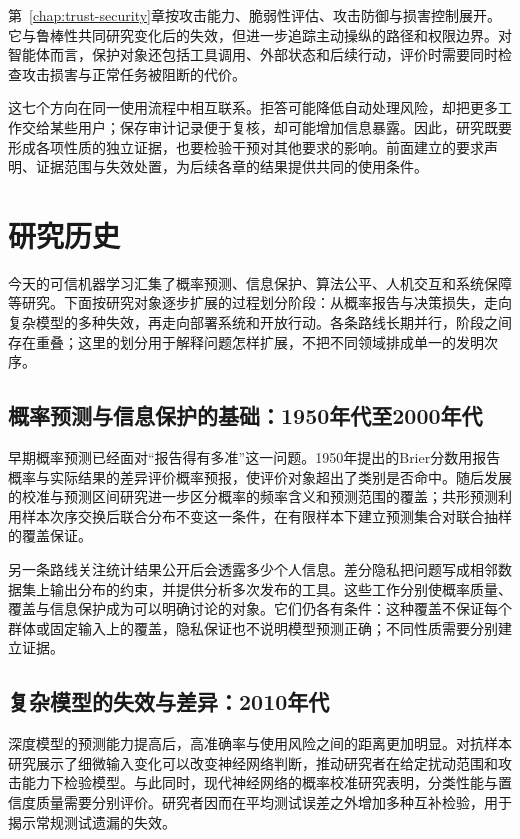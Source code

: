 第~\ref{chap:trust-security}章按攻击能力、脆弱性评估、攻击防御与损害控制展开。它与鲁棒性共同研究变化后的失效，但进一步追踪主动操纵的路径和权限边界。对智能体而言，保护对象还包括工具调用、外部状态和后续行动，评价时需要同时检查攻击损害与正常任务被阻断的代价。

这七个方向在同一使用流程中相互联系。拒答可能降低自动处理风险，却把更多工作交给某些用户；保存审计记录便于复核，却可能增加信息暴露。因此，研究既要形成各项性质的独立证据，也要检验干预对其他要求的影响。前面建立的要求声明、证据范围与失效处置，为后续各章的结果提供共同的使用条件。

\section{研究历史}
\label{sec:trust-research-history}

今天的可信机器学习汇集了概率预测、信息保护、算法公平、人机交互和系统保障等研究。下面按研究对象逐步扩展的过程划分阶段：从概率报告与决策损失，走向复杂模型的多种失效，再走向部署系统和开放行动。各条路线长期并行，阶段之间存在重叠；这里的划分用于解释问题怎样扩展，不把不同领域排成单一的发明次序。

\subsection{概率预测与信息保护的基础：1950年代至2000年代}

早期概率预测已经面对“报告得有多准”这一问题。1950年提出的Brier分数用报告概率与实际结果的差异评价概率预报，使评价对象超出了类别是否命中。随后发展的校准与预测区间研究进一步区分概率的频率含义和预测范围的覆盖；共形预测利用样本次序交换后联合分布不变这一条件，在有限样本下建立预测集合对联合抽样的覆盖保证。

另一条路线关注统计结果公开后会透露多少个人信息。差分隐私把问题写成相邻数据集上输出分布的约束，并提供分析多次发布的工具。这些工作分别使概率质量、覆盖与信息保护成为可以明确讨论的对象。它们仍各有条件：这种覆盖不保证每个群体或固定输入上的覆盖，隐私保证也不说明模型预测正确；不同性质需要分别建立证据。

\subsection{复杂模型的失效与差异：2010年代}

深度模型的预测能力提高后，高准确率与使用风险之间的距离更加明显。对抗样本研究展示了细微输入变化可以改变神经网络判断，推动研究者在给定扰动范围和攻击能力下检验模型。与此同时，现代神经网络的概率校准研究表明，分类性能与置信度质量需要分别评价。研究者因而在平均测试误差之外增加多种互补检验，用于揭示常规测试遗漏的失效。

